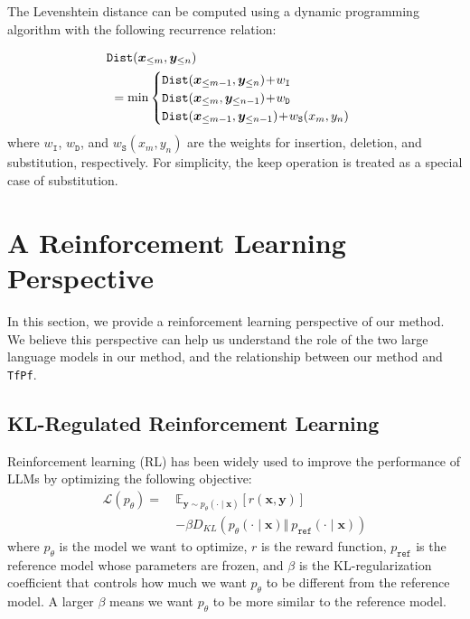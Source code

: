 The Levenshtein distance can be computed using a dynamic programming algorithm with the following recurrence relation:

\begin{equation*}
    \begin{aligned}
         & \mathtt{Dist}(\substring{x}_{\le m}, \substring{y}_{\le n})                                                \\
         & \ = \min \begin{cases}
                        \mathtt{Dist}(\substring{x}_{\le m - 1}, \substring{y}_{\le n})\!+\!{}w_{\mathtt{I}} \\
                        \mathtt{Dist}(\substring{x}_{\le m}, \substring{y}_{\le n - 1})\!+\!{}w_{\mathtt{D}} \\
                        \mathtt{Dist}(\substring{x}_{\le m - 1}, \substring{y}_{\le n - 1})\!+\!{}w_{\mathtt{S}}(x_m, y_n)
                    \end{cases} %
    \end{aligned}%
\end{equation*}%
where $w_{\mathtt{I}}$, $w_{\mathtt{D}}$, and $w_{\mathtt{S}}(x_m, y_n)$ are the weights for insertion, deletion, and substitution, respectively.
For simplicity, the keep operation is treated as a special case of substitution.

\section{A Reinforcement Learning Perspective}
\label{sec:reinforcement_learning_perspective}
In this section, we provide a reinforcement learning perspective of our method.
We believe this perspective can help us understand the role of the two large language models in our method, and the relationship between our method and \texttt{TfPf}.

\subsection{KL-Regulated Reinforcement Learning}
Reinforcement learning (RL) has been widely used to improve the performance of LLMs by optimizing the following objective:
\begin{equation}
    \begin{aligned}
        \mathcal{L}(p_{\theta}) =\  & \mathbb{E}_{\boldsymbol{y}\sim p_{\theta}(\cdot\mid \boldsymbol{x})} \left[ r(\boldsymbol{x}, \boldsymbol{y}) \right]                   \\
                                    & - \beta D_{KL}\left(p_{\theta}\left(\cdot\mid \boldsymbol{x}\right) \Vert\ p_{\mathtt{ref}}\left(\cdot\mid \boldsymbol{x}\right)\right)
    \end{aligned}
\end{equation}
where $p_{\theta}$ is the model we want to optimize, $r$ is the reward function, $p_{\mathtt{ref}}$ is the reference model whose parameters are frozen, and $\beta$ is the KL-regularization coefficient that controls how much we want $p_{\theta}$ to be different from the reference model.
A larger $\beta$ means we want $p_{\theta}$ to be more similar to the reference model.

